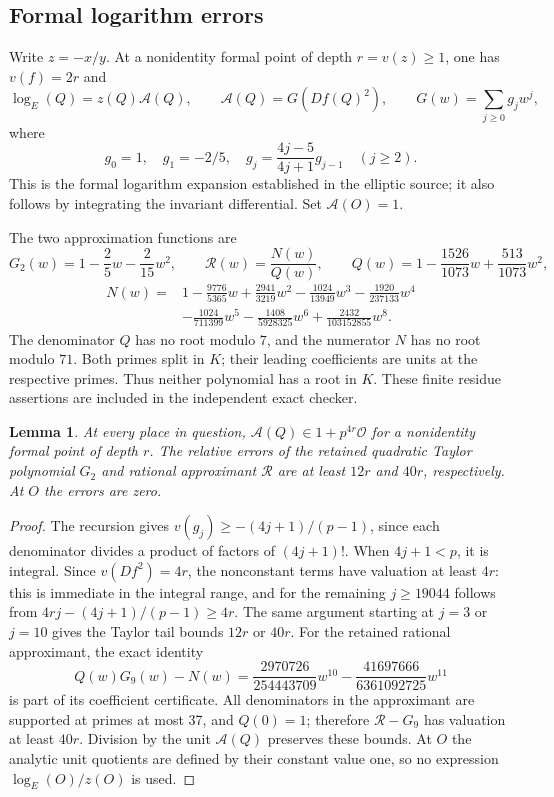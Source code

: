 \documentclass[11pt,a4paper]{article}
\newtheorem{lemma}[theorem]{Lemma}
\theoremstyle{remark}\newtheorem{remark}[theorem]{Remark}
\begin{document}
\subsection{Formal logarithm errors}
Write $z=-x/y$. At a nonidentity formal point of depth
$r=v(z)\ge1$, one has $v(f)=2r$ and
\[
 \log_E(Q)=z(Q)\mathcal A(Q),\qquad
 \mathcal A(Q)=G(Df(Q)^2),\qquad
 G(w)=\sum_{j\ge0}g_jw^j,
\]
where
\[
 g_0=1,\quad g_1=-2/5,\quad
 g_j=\frac{4j-5}{4j+1}g_{j-1}\quad(j\ge2).
\]
This is the formal logarithm expansion established in the elliptic
source; it also follows by integrating the invariant differential.
Set $\mathcal A(O)=1$.

The two approximation functions are
\[
 G_2(w)=1-\frac25w-\frac2{15}w^2,\qquad
 \mathcal R(w)=\frac{N(w)}{Q(w)},\qquad
 Q(w)=1-\frac{1526}{1073}w+\frac{513}{1073}w^2,
\]
\begin{align*}
 N(w)={}&1-\frac{9776}{5365}w+\frac{2941}{3219}w^2
 -\frac{1024}{13949}w^3-\frac{1920}{237133}w^4\\
 &-\frac{1024}{711399}w^5-\frac{1408}{5928325}w^6
 +\frac{2432}{103152855}w^8.
\end{align*}
The denominator $Q$ has no root modulo $7$, and the numerator $N$
has no root modulo $71$. Both primes split in $K$; their leading
coefficients are units at the respective primes. Thus neither
polynomial has a root in $K$. These finite residue assertions are
included in the independent exact checker.

\begin{lemma}\label{lem:logerror}
At every place in question,
$\mathcal A(Q)\in1+p^{4r}\mathcal O$ for a nonidentity formal point
of depth $r$. The relative errors of the retained quadratic Taylor
polynomial $G_2$ and rational approximant $\mathcal R$ are at least
$12r$ and $40r$, respectively. At $O$ the errors are zero.
\end{lemma}
\begin{proof}
The recursion gives $v(g_j)\ge-(4j+1)/(p-1)$, since each denominator
divides a product of factors of $(4j+1)!$. When $4j+1<p$, it is
integral. Since $v(Df^2)=4r$, the nonconstant terms have valuation
at least $4r$: this is immediate in the integral range, and for the
remaining $j\ge19044$ follows from
$4rj-(4j+1)/(p-1)\ge4r$.
The same argument starting at $j=3$ or $j=10$ gives the Taylor tail
bounds $12r$ or $40r$.
For the retained rational approximant, the exact identity
\[
 Q(w)G_9(w)-N(w)
 =\frac{2970726}{254443709}w^{10}
 -\frac{41697666}{6361092725}w^{11}
\]
is part of its coefficient certificate. All denominators in the
approximant are supported at primes at most 37, and $Q(0)=1$;
therefore $\mathcal R-G_9$ has valuation at least $40r$.
Division by the unit $\mathcal A(Q)$ preserves these bounds.
At $O$ the analytic unit quotients are defined by their constant
value one, so no expression $\log_E(O)/z(O)$ is used.
\end{proof}
\end{document}
